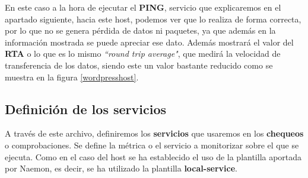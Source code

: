 En este caso a la hora de ejecutar el \textbf{PING}, servicio que explicaremos en el apartado siguiente, hacia este host, podemos ver que lo realiza de forma correcta, por lo que no se genera pérdida de datos ni paquetes, ya que además en la información mostrada se puede apreciar ese dato. Además mostrará el valor del \textbf{RTA} o lo que es lo mismo \textit{``round trip average"}, que medirá la velocidad de transferencia de los datos, siendo este un valor bastante reducido como se muestra en la figura \ref{wordpresshost}.

\subsection{Definición de los servicios}
A través de este archivo, definiremos los \textbf{servicios} que usaremos en los \textbf{chequeos} o comprobaciones. Se define la métrica o el servicio a monitorizar sobre el que se ejecuta.
Como en el caso del host se ha establecido el uso de la plantilla aportada por Naemon, es decir, se ha utilizado la plantilla \textbf{local-service}.

